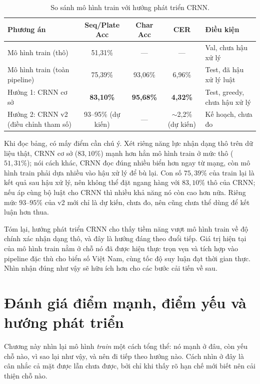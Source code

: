 \documentclass[12pt,a4paper]{report}
\begin{document}
\begin{table}[H]
\centering
\caption{So sánh mô hình train với hướng phát triển CRNN.}
\label{tab:compare}
\begin{tabular}{p{3.5cm}cccp{3.1cm}}
\toprule
\textbf{Phương án} & \textbf{Seq/Plate Acc} & \textbf{Char Acc} & \textbf{CER} & \textbf{Điều kiện} \\
\midrule
Mô hình train (thô) & 51,31\% & --- & --- & Val, chưa hậu xử lý \\
Mô hình train (toàn pipeline) & 75,39\% & 93,06\% & 6,96\% & Test, đã hậu xử lý luật \\
Hướng 1: CRNN cơ sở & \textbf{83,10\%} & \textbf{95,68\%} & \textbf{4,32\%} & Test, greedy, chưa hậu xử lý \\
Hướng 2: CRNN v2 (điều chỉnh tham số) & 93--95\% (dự kiến) & --- & $\sim$2,2\% (dự kiến) & Kế hoạch, chưa đo \\
\bottomrule
\end{tabular}
\end{table}

Khi đọc bảng, có mấy điểm cần chú ý. Xét riêng năng lực nhận dạng thô trên dữ liệu thật, CRNN cơ sở ($83{,}10\%$) mạnh hơn hẳn mô hình train ở mức thô ($51{,}31\%$); nói cách khác, CRNN đọc đúng nhiều biển hơn ngay từ mạng, còn mô hình train phải dựa nhiều vào hậu xử lý để bù lại. Con số $75{,}39\%$ của train lại là kết quả sau hậu xử lý, nên không thể đặt ngang hàng với $83{,}10\%$ thô của CRNN; nếu áp cùng bộ luật cho CRNN thì nhiều khả năng nó còn cao hơn nữa. Riêng mức $93$--$95\%$ của v2 mới chỉ là dự kiến, chưa đo, nên cũng chưa thể dùng để kết luận hơn thua.

Tóm lại, hướng phát triển CRNN cho thấy tiềm năng vượt mô hình train về độ chính xác nhận dạng thô, và đây là hướng đáng theo đuổi tiếp. Giá trị hiện tại của mô hình train nằm ở chỗ nó đã được hiện thực trọn vẹn và tích hợp vào pipeline đặc thù cho biển số Việt Nam, cùng tốc độ suy luận đạt thời gian thực. Nhìn nhận đúng như vậy sẽ hữu ích hơn cho các bước cải tiến về sau.

\chapter{Đánh giá điểm mạnh, điểm yếu và hướng phát triển}

Chương này nhìn lại mô hình \emph{train} một cách tổng thể: nó mạnh ở đâu, còn yếu chỗ nào, vì sao lại như vậy, và nên đi tiếp theo hướng nào. Cách nhìn ở đây là cân nhắc cả mặt được lẫn chưa được, bởi chỉ khi thấy rõ hạn chế mới biết nên cải thiện chỗ nào.
\end{document}

